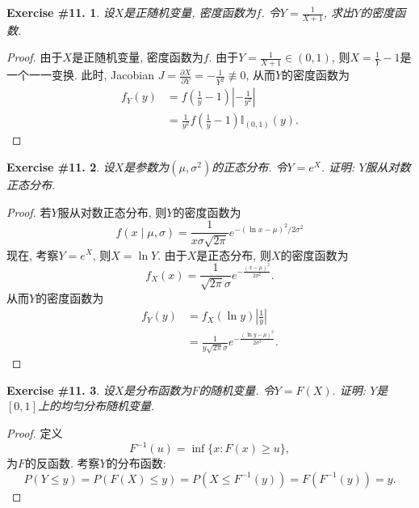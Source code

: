 \documentclass[UTF8, a4paper]{article}
\newtheorem{exercise}{Exercise \#11.}
\begin{document}
\begin{framed}
\begin{exercise}
设\(X\)是正随机变量, 密度函数为\(f\). 令\(Y = \frac{1}{X+1}\), 求出\(Y\)的密度函数.
\end{exercise}
\end{framed}


\begin{proof}
由于\(X\)是正随机变量, 密度函数为\(f\). 
由于\(Y = \frac{1}{X+1} \in (0, 1)\), 则\(X = \frac{1}{Y} - 1\)是一个一一变换.
此时, Jacobian \(J = \frac{\partial X}{\partial Y} = -\frac{1}{Y^2} \not\equiv 0\), 从而\(Y\)的密度函数为
$$
\begin{aligned}
f_Y(y) &= f\left(\frac{1}{y} - 1\right) \left|-\frac{1}{y^2}\right| \\
&= \frac{1}{y^2} f\left(\frac{1}{y} - 1\right) \mathbb{I}_{(0,1)}(y).
\end{aligned}
$$
\end{proof}


\begin{framed}
\begin{exercise}
设\(X\)是参数为\((\mu, \sigma^2)\)的正态分布. 令\(Y = e^X\). 证明: \(Y\)服从对数正态分布.
\end{exercise}
\end{framed}

\begin{proof}
若\(Y\)服从对数正态分布, 则\(Y\)的密度函数为
$$
{\displaystyle f(x\mid \mu ,\sigma )={\frac {1}{x\sigma {\sqrt {2\pi }}}}e^{-(\ln x-\mu )^{2}/2\sigma ^{2}}}
$$
现在, 考察\(Y = e^X\), 则\(X = \ln Y\). 由于\(X\)是正态分布, 则\(X\)的密度函数为
$$
f_X(x) = \frac{1}{\sqrt{2\pi}\sigma} e^{-\frac{(x-\mu)^2}{2\sigma^2}}.
$$
从而\(Y\)的密度函数为
$$
\begin{aligned}
f_Y(y) &= f_X(\ln y) \left|\frac{1}{y}\right| \\
&= \frac{1}{y\sqrt{2\pi}\sigma} e^{-\frac{(\ln y - \mu)^2}{2\sigma^2}}.
\end{aligned}
$$

\end{proof}


\begin{framed}
\begin{exercise}
设\(X\)是分布函数为\(F\)的随机变量. 令\(Y = F(X)\). 证明: \(Y\)是\([0,1]\)上的均匀分布随机变量.
\end{exercise}
\end{framed}

\begin{proof}
定义
$$
F^{-1}(u) = \inf\{x: F(x) \geq u\},
$$
为\(F\)的反函数.
考察\(Y\)的分布函数:
$$
P(Y\leq y) = P(F(X) \leq y) = P(X \leq F^{-1}(y)) = F(F^{-1}(y)) = y.
$$
\end{proof}
\end{document}
